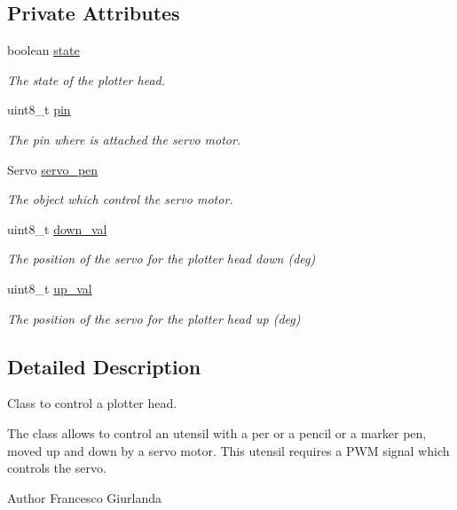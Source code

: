 \subsection*{Private Attributes}
\begin{DoxyCompactItemize}
\item 
boolean \hyperlink{class_plotter_servo_a3309473d867ae37982f1ff0caba0c86b}{state}
\begin{DoxyCompactList}\small\item\em The state of the plotter head. \end{DoxyCompactList}\item 
uint8\+\_\+t \hyperlink{class_plotter_servo_a9c40d2afb9b5ae278deb8eab8b48a489}{pin}
\begin{DoxyCompactList}\small\item\em The pin where is attached the servo motor. \end{DoxyCompactList}\item 
Servo \hyperlink{class_plotter_servo_a9ecf1d8c79d1c73c3977198bb28b55a7}{servo\+\_\+pen}
\begin{DoxyCompactList}\small\item\em The object which control the servo motor. \end{DoxyCompactList}\item 
uint8\+\_\+t \hyperlink{class_plotter_servo_ad1150ec2c679af23d0a57cef4df7ff0a}{down\+\_\+val}
\begin{DoxyCompactList}\small\item\em The position of the servo for the plotter head down (deg) \end{DoxyCompactList}\item 
uint8\+\_\+t \hyperlink{class_plotter_servo_ac5a8cf60736715222a53a774c4e077f7}{up\+\_\+val}
\begin{DoxyCompactList}\small\item\em The position of the servo for the plotter head up (deg) \end{DoxyCompactList}\end{DoxyCompactItemize}


\subsection{Detailed Description}
Class to control a plotter head. 

The class allows to control an utensil with a per or a pencil or a marker pen, moved up and down by a servo motor. This utensil requires a P\+W\+M signal which controls the servo. \begin{DoxyAuthor}{Author}
Francesco Giurlanda 
\end{DoxyAuthor}


